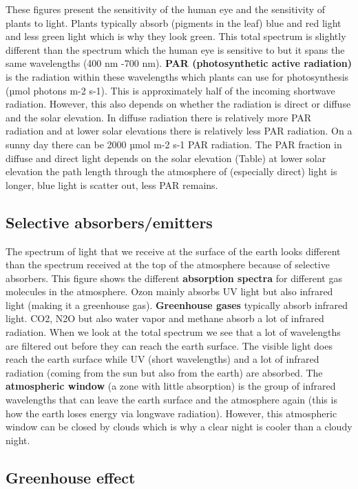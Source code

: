 \documentclass[oneside]{book}
\begin{document}
These figures present the sensitivity of the human eye and the
sensitivity of plants to light. Plants typically absorb (pigments in the
leaf) blue and red light and less green light which is why they look
green. This total spectrum is slightly different than the spectrum which
the human eye is sensitive to but it spans the same wavelengths (400 nm
-700 nm). \textbf{PAR (photosynthetic active radiation)} is the
radiation within these wavelengths which plants can use for
photosynthesis (µmol photons m-2 s-1). This is approximately half of the
incoming shortwave radiation. However, this also depends on whether the
radiation is direct or diffuse and the solar elevation. In diffuse
radiation there is relatively more PAR radiation and at lower solar
elevations there is relatively less PAR radiation. On a sunny day there
can be 2000 µmol m-2 s-1 PAR radiation. The PAR fraction in diffuse and
direct light depends on the solar elevation (Table) at lower solar
elevation the path length through the atmosphere of (especially direct)
light is longer, blue light is scatter out, less PAR remains.

\subsection{Selective
absorbers/emitters}\label{selective-absorbersemitters}

The spectrum of light that we receive at the surface of the earth looks
different than the spectrum received at the top of the atmosphere
because of selective absorbers. This figure shows the different
\textbf{absorption spectra} for different gas molecules in the
atmosphere. Ozon mainly absorbs UV light but also infrared light (making
it a greenhouse gas). \textbf{Greenhouse gases} typically absorb
infrared light. CO2, N2O but also water vapor and methane absorb a lot
of infrared radiation. When we look at the total spectrum we see that a
lot of wavelengths are filtered out before they can reach the earth
surface. The visible light does reach the earth surface while UV (short
wavelengths) and a lot of infrared radiation (coming from the sun but
also from the earth) are absorbed. The \textbf{atmospheric window} (a
zone with little absorption) is the group of infrared wavelengths that
can leave the earth surface and the atmosphere again (this is how the
earth loses energy via longwave radiation). However, this atmospheric
window can be closed by clouds which is why a clear night is cooler than
a cloudy night.

\subsection{Greenhouse effect}\label{greenhouse-effect}
\end{document}
